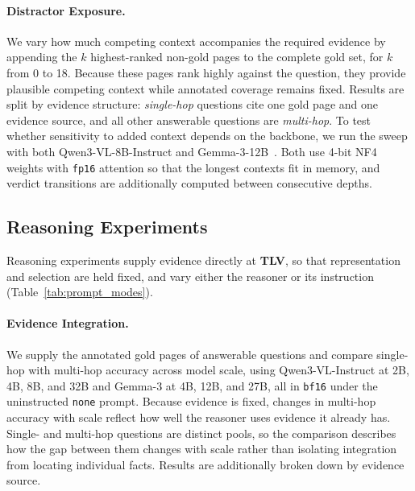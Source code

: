 \paragraph{Distractor Exposure.} We vary how much competing context accompanies the required evidence by appending the $k$ highest-ranked non-gold pages to the complete gold set, for $k$ from 0 to 18. Because these pages rank highly against the question, they provide plausible competing context while annotated coverage remains fixed. Results are split by evidence structure: \emph{single-hop} questions cite one gold page and one evidence source, and all other answerable questions are \emph{multi-hop}. To test whether sensitivity to added context depends on the backbone, we run the sweep with both Qwen3-VL-8B-Instruct and Gemma-3-12B~\citep{team2025gemma}. Both use 4-bit NF4 weights with \texttt{fp16} attention so that the longest contexts fit in memory, and verdict transitions are additionally computed between consecutive depths.

\subsection{Reasoning Experiments}
\label{sec:emp_reasoning}

Reasoning experiments supply evidence directly at \textbf{TLV}, so that representation and selection are held fixed, and vary either the reasoner or its instruction (Table~\ref{tab:prompt_modes}).

\paragraph{Evidence Integration.} We supply the annotated gold pages of answerable questions and compare single-hop with multi-hop accuracy across model scale, using Qwen3-VL-Instruct at 2B, 4B, 8B, and 32B and Gemma-3 at 4B, 12B, and 27B, all in \texttt{bf16} under the uninstructed \texttt{none} prompt. Because evidence is fixed, changes in multi-hop accuracy with scale reflect how well the reasoner uses evidence it already has. Single- and multi-hop questions are distinct pools, so the comparison describes how the gap between them changes with scale rather than isolating integration from locating individual facts. Results are additionally broken down by evidence source.



